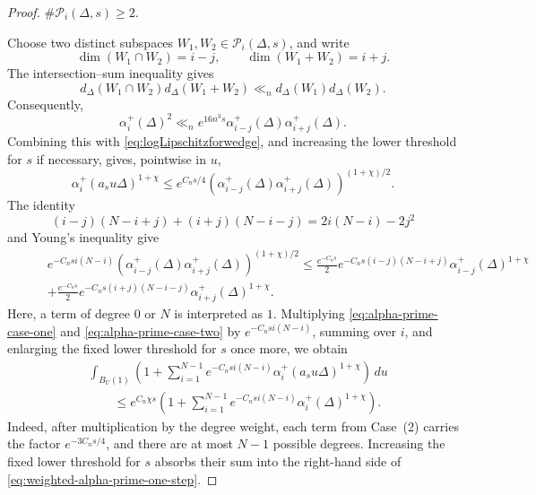 \documentclass[reqno,11pt]{amsart}
\numberwithin{equation}{section}
\theoremstyle{definition}
\theoremstyle{remark}
\begin{document}
\begin{proof}
 $\#\mathcal P_i(\Delta,s)\ge2$.

Choose two distinct subspaces $W_1,W_2\in\mathcal P_i(\Delta,s)$, and
write
$$
\dim(W_1\cap W_2)=i-j,
\qquad
\dim(W_1+W_2)=i+j.
$$
The intersection--sum inequality
\cite[Lemma~5.6]{eskin-margulis-mozes:1998} gives
$$
d_\Delta(W_1\cap W_2)d_\Delta(W_1+W_2)
\ll_n d_\Delta(W_1)d_\Delta(W_2).
$$
Consequently,
$$
\alpha_i^+(\Delta)^2
\ll_n
e^{16n^3s}
\alpha_{i-j}^+(\Delta)\alpha_{i+j}^+(\Delta).
$$
Combining this with \eqref{eq:logLipschitzforwedge}, and increasing the
lower threshold for $s$ if necessary, gives, pointwise in $u$,
\begin{equation}\label{eq:alpha-prime-case-two}
\alpha_i^+(a_su\Delta)^{1+\chi}
\le
e^{C_ns/4}
\left(
\alpha_{i-j}^+(\Delta)\alpha_{i+j}^+(\Delta)
\right)^{(1+\chi)/2}.
\end{equation}
The identity
$$
(i-j)(N-i+j)+(i+j)(N-i-j)
=
2i(N-i)-2j^2
$$
and Young's inequality give
\begin{align*}
&e^{-C_nsi(N-i)}
\left(
\alpha_{i-j}^+(\Delta)\alpha_{i+j}^+(\Delta)
\right)^{(1+\chi)/2} \le
\tfrac{e^{-C_ns}}2
e^{-C_ns(i-j)(N-i+j)}
\alpha_{i-j}^+(\Delta)^{1+\chi}
\\ \qquad &+
\tfrac{e^{-C_ns}}2
e^{-C_ns(i+j)(N-i-j)}
\alpha_{i+j}^+(\Delta)^{1+\chi}.
\end{align*}
Here, a term of degree $0$ or $N$ is interpreted as $1$. Multiplying
\eqref{eq:alpha-prime-case-one} and
\eqref{eq:alpha-prime-case-two} by $e^{-C_nsi(N-i)}$, summing over $i$,
and enlarging the fixed lower threshold for $s$ once more, we obtain
\begin{equation}\label{eq:weighted-alpha-prime-one-step}
\begin{aligned}
&\int_{B_{U}(1)}
\left(
1+\sum_{i=1}^{N-1}
e^{-C_nsi(N-i)}
\alpha_i^+(a_su\Delta)^{1+\chi}
\right)\,du\\
&\qquad\le
e^{C_n\chi s}
\left(
1+\sum_{i=1}^{N-1}
e^{-C_nsi(N-i)}
\alpha_i^+(\Delta)^{1+\chi}
\right).
\end{aligned}
\end{equation}
Indeed, after multiplication by the degree weight, each term from
Case~(2) carries the factor $e^{-3C_ns/4}$, and there are at most $N-1$
possible degrees. Increasing the fixed lower threshold for $s$ absorbs
their sum into the right-hand side of
\eqref{eq:weighted-alpha-prime-one-step}.


\end{proof}
\end{document}
